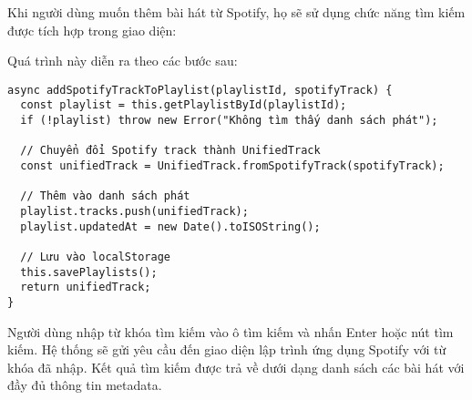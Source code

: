 \documentclass[12pt,a4paper]{article}
\begin{document}
Khi người dùng muốn thêm bài hát từ Spotify, họ sẽ sử dụng chức năng tìm kiếm được tích hợp trong giao diện:

\begin{center}
\end{center}

Quá trình này diễn ra theo các bước sau:

\begin{lstlisting}[caption={Tệp: src/services/unifiedPlaylistManager.js}]
async addSpotifyTrackToPlaylist(playlistId, spotifyTrack) {
  const playlist = this.getPlaylistById(playlistId);
  if (!playlist) throw new Error("Không tìm thấy danh sách phát");

  // Chuyển đổi Spotify track thành UnifiedTrack
  const unifiedTrack = UnifiedTrack.fromSpotifyTrack(spotifyTrack);
  
  // Thêm vào danh sách phát
  playlist.tracks.push(unifiedTrack);
  playlist.updatedAt = new Date().toISOString();
  
  // Lưu vào localStorage
  this.savePlaylists();
  return unifiedTrack;
}
\end{lstlisting}

Người dùng nhập từ khóa tìm kiếm vào ô tìm kiếm và nhấn Enter hoặc nút tìm kiếm. Hệ thống sẽ gửi yêu cầu đến giao diện lập trình ứng dụng Spotify với từ khóa đã nhập. Kết quả tìm kiếm được trả về dưới dạng danh sách các bài hát với đầy đủ thông tin metadata.
\end{document}
